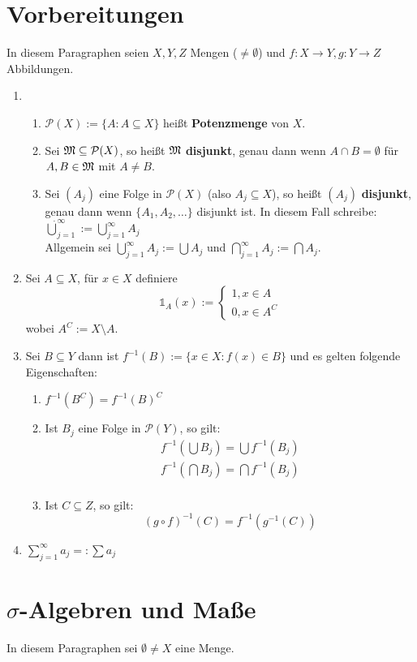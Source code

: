 \documentclass[a4paper,twoside,DIV15,BCOR12mm,chapterprefix=true,headings=onelinechapter]{scrbook}
\begin{document}
\chapter{Vorbereitungen}
In diesem Paragraphen seien $X,Y,Z$ Mengen ($\ne\emptyset$) und $f:X\to Y, g:Y\to Z$ Abbildungen.
\begin{enumerate}
\item 
\begin{enumerate}
\item $\mathcal{P}(X):=\{A:A\subseteq X\}$ heißt \textbf{Potenzmenge} von $X$.
\item Sei $\mathfrak{M}\subseteq\mathcal{P}(X)$, so heißt $\mathfrak{M}$ \textbf{disjunkt}, genau dann wenn $A\cap B=\emptyset$ für $A,B\in\mathfrak{M}$ mit $A\ne B$.
\item Sei $(A_j)$ eine Folge in $\mathcal{P}(X)$ (also $A_j\subseteq X$), so heißt $(A_j)$ \textbf{disjunkt}, genau dann wenn $\{A_1,A_2,\ldots\}$ disjunkt ist. In diesem Fall schreibe: $\dot{\bigcup}_{j=1}^\infty:=\bigcup_{j=1}^\infty A_j$\\
Allgemein sei $\bigcup_{j=1}^\infty A_j:=\bigcup A_j$ und $\bigcap_{j=1}^\infty A_j:=\bigcap A_j$.
\end{enumerate}
\item Sei $A\subseteq X$, für $x\in X$ definiere
\[\mathds{1}_A(x):=\begin{cases}1, x\in A\\ 0, x\in A^C\end{cases}\]
wobei $A^C:=X\setminus A$.
\item Sei $B\subseteq Y$ dann ist $f^{-1}(B):=\{x\in X: f(x)\in B\}$ und es gelten folgende Eigenschaften:
\begin{enumerate}
\item $f^{-1}(B^C)=f^{-1}(B)^C$
\item Ist $B_j$ eine Folge in $\mathcal{P}(Y)$, so gilt:
\begin{align*}
f^{-1}(\bigcup B_j)=\bigcup f^{-1}(B_j)\\
f^{-1}(\bigcap B_j)=\bigcap f^{-1}(B_j)\\
\end{align*}
\item Ist $C\subseteq Z$, so gilt:
\[(g\circ f)^{-1}(C)=f^{-1}(g^{-1}(C))\]
\end{enumerate}
\item $\sum_{j=1}^\infty a_j =: \sum a_j$
\end{enumerate}

\chapter{$\sigma$-Algebren und Maße}
In diesem Paragraphen sei $\emptyset\ne X$ eine Menge.
\end{document}
